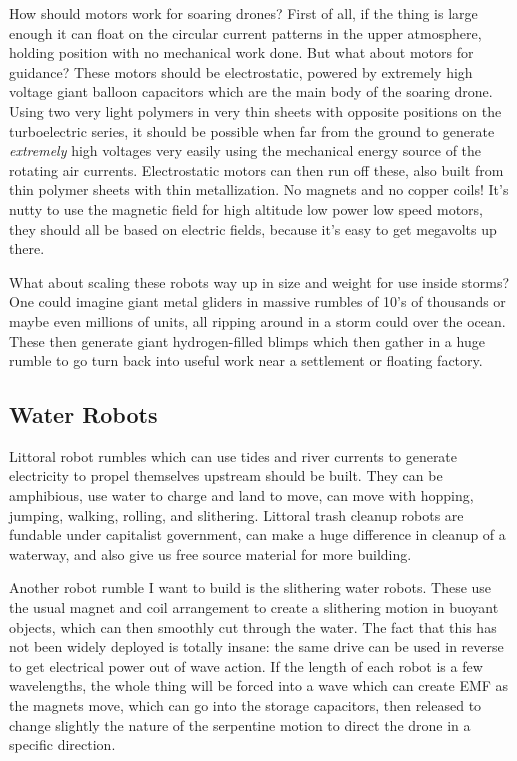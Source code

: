 \documentclass[11pt]{article}
\begin{document}
How should motors work for soaring drones? First of all, if the thing is
large enough it can float on the circular current patterns in the upper
atmosphere, holding position with no mechanical work done. But what
about motors for guidance? These motors should be electrostatic, powered
by extremely high voltage giant balloon capacitors which are the main
body of the soaring drone. Using two very light polymers in very thin
sheets with opposite positions on the turboelectric series, it should be
possible when far from the ground to generate \emph{extremely} high
voltages very easily using the mechanical energy source of the rotating
air currents. Electrostatic motors can then run off these, also built
from thin polymer sheets with thin metallization. No magnets and no
copper coils! It's nutty to use the magnetic field for high altitude low
power low speed motors, they should all be based on electric fields,
because it's easy to get megavolts up there.

What about scaling these robots way up in size and weight for use inside
storms? One could imagine giant metal gliders in massive rumbles of 10's
of thousands or maybe even millions of units, all ripping around in a
storm could over the ocean. These then generate giant hydrogen-filled
blimps which then gather in a huge rumble to go turn back into useful
work near a settlement or floating factory.

\subsection{Water Robots}\label{water-robots}

Littoral robot rumbles which can use tides and river currents to
generate electricity to propel themselves upstream should be built. They
can be amphibious, use water to charge and land to move, can move with
hopping, jumping, walking, rolling, and slithering. Littoral trash
cleanup robots are fundable under capitalist government, can make a huge
difference in cleanup of a waterway, and also give us free source
material for more building.

Another robot rumble I want to build is the slithering water robots.
These use the usual magnet and coil arrangement to create a slithering
motion in buoyant objects, which can then smoothly cut through the
water. The fact that this has not been widely deployed is totally
insane: the same drive can be used in reverse to get electrical power
out of wave action. If the length of each robot is a few wavelengths,
the whole thing will be forced into a wave which can create EMF as the
magnets move, which can go into the storage capacitors, then released to
change slightly the nature of the serpentine motion to direct the drone
in a specific direction.
\end{document}
